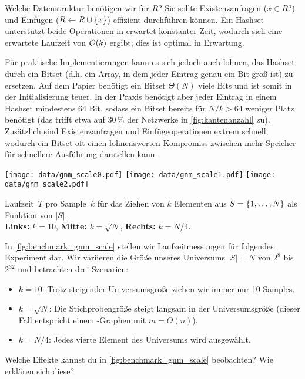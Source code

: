 Welche Datenstruktur benötigen wir für $R$? Sie sollte Existenzanfragen ($x \in R$?) und Einfügen ($R \gets R \cup \left\{x\right\}$) effizient durchführen können.
Ein Hashset unterstützt beide Operationen in erwartet konstanter Zeit, wodurch sich eine erwartete Laufzeit von $\mathcal{O}\!\left(k\right)$ ergibt; dies ist optimal in Erwartung.

Für praktische Implementierungen kann es sich jedoch auch lohnen, das Hashset durch ein Bitset (d.h. ein Array, in dem jeder Eintrag genau ein Bit groß ist) zu ersetzen.
Auf dem Papier benötigt ein Bitset $\Theta(N)$ viele Bits und ist somit in der Initialisierung teuer.
In der Praxis benötigt aber jeder Eintrag in einem Hashset mindestens 64 Bit, sodass ein Bitset bereits für $N / k > 64$ weniger Platz benötigt (das trifft etwa auf 30\,\% der Netzwerke in \cref{fig:kantenanzahl} zu).
Zusätzlich sind Existenzanfragen und Einfügeoperationen extrem schnell, wodurch ein Bitset oft einen lohnenswerten Kompromiss zwischen mehr Speicher für schnellere Ausführung darstellen kann.

\begin{widefigure}
    \texttt{[image: data/gnm\_scale0.pdf]}\hfill
    \texttt{[image: data/gnm\_scale1.pdf]}\hfill
    \texttt{[image: data/gnm\_scale2.pdf]}

    \caption{
        Laufzeit~$T$ pro Sample~$k$ für das Ziehen von $k$ Elementen aus $S = \left\{1, \ldots, N\right\}$ als Funktion von $|S|$.\\
        \textbf{Links:} $k=10$, \textbf{Mitte: } $k = \sqrt{N}$, \textbf{Rechts: } $k = N / 4$.
    }
    \label{fig:benchmark_gnm_scale}
\end{widefigure}

In \cref{fig:benchmark_gnm_scale} stellen wir Laufzeitmessungen für folgendes Experiment dar.
Wir variieren die Größe unseres Universums $|S| = N$ von $2^8$ bis $2^{32}$ und betrachten drei Szenarien:
\begin{itemize}
    \item $k=10$: Trotz steigender Universumsgröße ziehen wir immer nur 10 Samples.
    \item $k=\sqrt{N}$: Die Stichprobengröße steigt langsam in der Universumsgröße (dieser Fall entspricht einem \Gnm-Graphen mit $m = \Theta(n)$).
    \item $k=N/4$: Jedes vierte Element des Universums wird ausgewählt.
\end{itemize}

\begin{exercise}
    Welche Effekte kannst du in \cref{fig:benchmark_gnm_scale} beobachten? Wie erklären sich diese?
\end{exercise}

